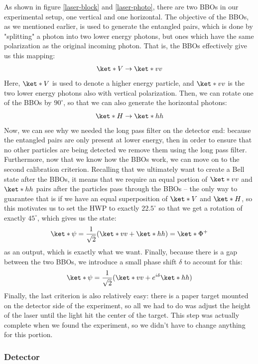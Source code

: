 \documentclass[10pt]{article}
\begin{document}
	As shown in figure \ref{laser-block} and \ref{laser-photo}, there are two BBOs in our experimental setup, 
	one vertical and one horizontal.
	The objective of the BBOs, as we mentioned earlier, is used to generate the entangled pairs, which is
	done by "splitting" a photon into two lower energy photons, but ones which have the same polarization as
	the original incoming photon. That is, the BBOs effectively give us this mapping:
	\[
		\ket*{V} \to \ket*{vv}
	\]
	Here, \( \ket*{V} \) is used to denote a higher energy particle, and \( \ket*{vv} \) is the two lower
	energy photons also with vertical polarization. Then, we can rotate one of the BBOs by \( 90^{\circ} \),
	so that we can also generate the horizontal photons:
	\[
		\ket*{H} \to \ket*{hh}
	\]
	Now, we can see why we needed the long pass filter on the detector end: because the entangled pairs are
	only present at lower energy, then in order to ensure that no other particles are being detected we
	remove them using the long pass filter. Furthermore, now that we know how the BBOs work, we can move on
	to the second calibration criterion. Recalling that we ultimately want to create a Bell state after the
	BBOs, it means that we require an equal portion of \( \ket*{vv} \) and \( \ket*{hh} \) pairs after the
	particles pass through the BBOs -- the only way to guarantee that is if we have an equal superposition of
	\( \ket*{V} \) and \( \ket*{H} \), so this motivates us to set the HWP to exactly \(
	22.5^{\circ} \) so that we get a rotation of exactly \( 45^{\circ} \), which gives us the state:
	\[
		\ket*{\psi} = \frac{1}{\sqrt{2}}(\ket*{vv} + \ket*{hh}) = \ket*{\Phi^{+}}
	\]
	as an output, which is exactly what we want. Finally, because there is a gap between the two BBOs, we
	introduce a small phase shift \( \delta \) to account for this: 
	\begin{equation}
		\label{exp-state}
		\ket*{\psi} = \frac{1}{\sqrt{2}}(\ket*{vv} + e^{i \delta}\ket*{hh})
	\end{equation}
	Finally, the last criterion is also relatively easy: there is a paper target mounted on the detector side
	of the experiment, so all we had to do was adjust the height of the laser until the light hit the center
	of the target. This step was actually complete when we found the experiment, so we didn't have to change
	anything for this portion.

	\subsubsection{Detector}
\end{document}
